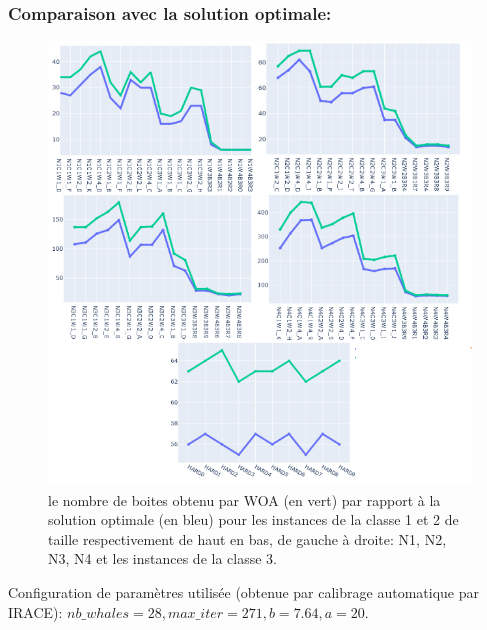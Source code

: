 \documentclass[12pt]{article}
\begin{document}
\subsubsection{Comparaison avec la solution optimale: }
\begin{figure}[!hbt]
    \includegraphics[width=\linewidth, scale=1.3]{../figures/WOA/woa_opt.png}
    \caption{le nombre de boites obtenu par WOA (en vert) par rapport à la solution optimale (en bleu) pour les instances de la classe 1 et 2 de taille respectivement de haut en bas, de gauche à droite: N1, N2, N3, N4 et les instances de la classe 3.}
\end{figure}
Configuration de paramètres utilisée (obtenue par calibrage automatique par IRACE): \(nb\_whales=28, max\_iter=271,  b=7.64, a=20\).
\end{document}
